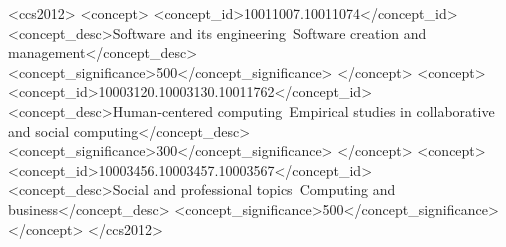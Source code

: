 \documentclass[sigconf, nonacm]{acmart}
\begin{document}
%
%

\begin{CCSXML}
<ccs2012>
   <concept>
       <concept_id>10011007.10011074</concept_id>
       <concept_desc>Software and its engineering~Software creation and management</concept_desc>
       <concept_significance>500</concept_significance>
       </concept>
   <concept>
       <concept_id>10003120.10003130.10011762</concept_id>
       <concept_desc>Human-centered computing~Empirical studies in collaborative and social computing</concept_desc>
       <concept_significance>300</concept_significance>
       </concept>
   <concept>
       <concept_id>10003456.10003457.10003567</concept_id>
       <concept_desc>Social and professional topics~Computing and business</concept_desc>
       <concept_significance>500</concept_significance>
       </concept>
 </ccs2012>
\end{CCSXML}



%




%

%
\maketitle


\end{document}
